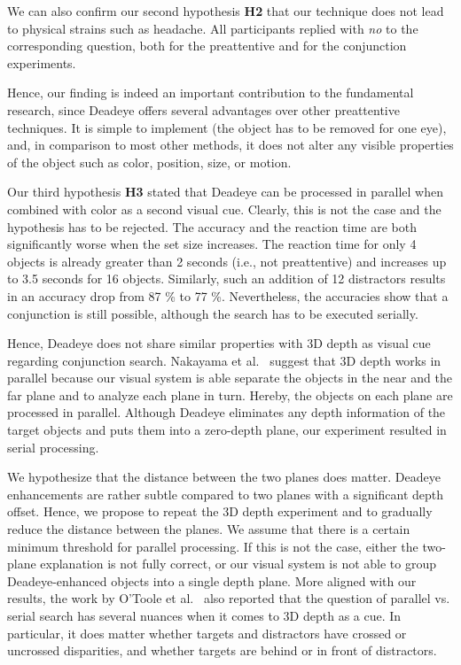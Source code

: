 \documentclass[journal]{vgtc}                %
\begin{document}
We can also confirm our second hypothesis \textbf{H2} that our technique does not lead to physical strains such as headache. All participants replied with \textit{no} to the corresponding question, both for the preattentive and for the conjunction experiments.

Hence, our finding is indeed an important contribution to the fundamental research, since Deadeye offers several advantages over other preattentive techniques. It is simple to implement (the object has to be removed for one eye), and, in comparison to most other methods, it does not alter any visible properties of the object such as color, position, size, or motion.


Our third hypothesis \textbf{H3} stated that Deadeye can be processed in parallel when combined with color as a second visual cue. Clearly, this is not the case and the hypothesis has to be rejected. The accuracy and the reaction time are both significantly worse when the set size increases. The reaction time for only 4 objects is already greater than 2 seconds (i.e., not preattentive) and increases up to 3.5 seconds for 16 objects. Similarly, such an addition of 12 distractors results in an accuracy drop from 87 \% to 77 \%. Nevertheless, the accuracies show that a conjunction is still possible, although the search has to be executed serially.

Hence, Deadeye does not share similar properties with 3D depth as visual cue regarding conjunction search. Nakayama et al.~\cite{nakayama1986serial} suggest that 3D depth works in parallel because our visual system is able separate the objects in the near and the far plane and to analyze each plane in turn. Hereby, the objects on each plane are processed in parallel. Although Deadeye eliminates any depth information of the target objects and puts them into a zero-depth plane, our experiment resulted in serial processing. 


We hypothesize that the distance between the two planes does matter. Deadeye enhancements are rather subtle compared to two planes with a significant depth offset. Hence, we propose to repeat the 3D depth experiment and to gradually reduce the distance between the planes. We assume that there is a certain minimum threshold for parallel processing. If this is not the case, either the two-plane explanation is not fully correct, or our visual system is not able to group Deadeye-enhanced objects into a single depth plane. More aligned with our results, the work by O'Toole et al.~\cite{o1997preattentive} also reported that the question of parallel vs. serial search has several nuances when it comes to 3D depth as a cue. In particular, it does matter whether targets and distractors have crossed or uncrossed disparities, and whether targets are behind or in front of distractors.
\end{document}
